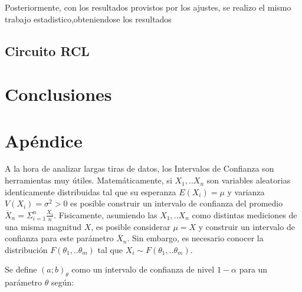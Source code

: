\documentclass[11pt,a4paper]{article}
\begin{document}
Posteriormente, con los resultados provistos por los ajustes, se realizo el mismo trabajo estadistico,obteniendose los resultados 





\subsection{Circuito RCL}




\section{Conclusiones}
\label{sec:conclusiones}





\section{Apéndice}
\label{sec:apendice}

A la hora de analizar largas tiras de datos, los Intervalos de Confianza son herramientas muy útiles. Matemáticamente, si $X_1,..X_n$ son variables aleatorias identicamente distribuidas tal que su esperanza $E(X_i) = \mu$ y varianza $V(X_i) = \sigma^2 > 0$ es posible construir un intervalo de confianza del promedio $\overline{X}_n = \Sigma_{i=1}^{n} \frac{X_i}{n}$. Fisicamente, asumiendo las $X_1,..X_n$ como distintas mediciones de una misma magnitud $X$, es posible considerar $\mu = X$ y construir un intervalo de confianza para este parámetro $\overline{X}_n$. Sin embargo, es necesario conocer la distribución $F(\theta_1,..\theta_m)$ tal que $X_i \sim F(\theta_1,..\theta_m)$. 

Se define $(a;b)_{\theta}$ como un intervalo de confianza de nivel $1-\alpha$ para un parámetro $\theta$ según:
\end{document}
